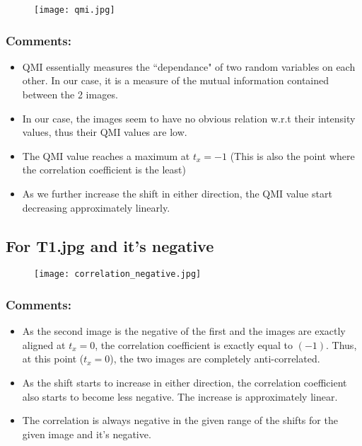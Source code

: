 \documentclass[11pt, fleqn]{article}
\begin{document}
\newpage
\begin{figure}[H]
    \centering
    \texttt{[image: qmi.jpg]}
    \label{q6ic}
\end{figure}
\subsubsection*{Comments:}
\begin{itemize}
    \item QMI essentially measures the ``dependance" of two random variables on each other. In our case, it is a measure of the mutual information contained between the 2 images.
    \item In our case, the images seem to have no obvious relation  w.r.t their intensity values, thus their QMI values are low.
    \item The QMI value reaches a maximum at $t_x=-1$ (This is also the point where the correlation coefficient is the least)
    \item As we further increase the shift in either direction, the QMI value start decreasing approximately linearly.
\end{itemize}

\newpage
\subsection*{\Large For T1.jpg and it's negative}
\begin{figure}[H]
    \centering
    \texttt{[image: correlation\_negative.jpg]}
    \label{q6ic}
\end{figure}

\subsubsection*{Comments:}
\begin{itemize}
    \item As the second image is the negative of the first and the images are exactly aligned at $t_x = 0$, the correlation coefficient is exactly equal to $(-1)$. Thus, at this point ($t_x = 0$), the two images are completely anti-correlated.
    \item As the shift starts to increase in either direction, the correlation coefficient also starts to become less negative. The increase is approximately linear.
    \item The correlation is always negative in the given range of the shifts for the given image and it's negative.
\end{itemize}
\end{document}
